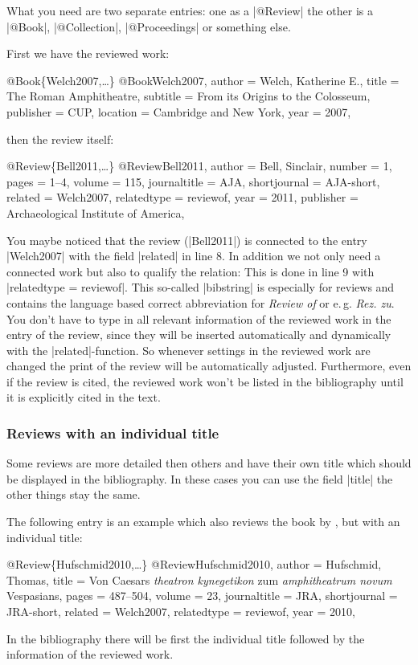 \documentclass[a4paper,
10pt,
greek,
french,
spanish,
italian,
ngerman,
english
]{ltxdoc}
\begin{document}
What you need are two separate entries: one as a |@Review| the other is a |@Book|, |@Collection|, |@Proceedings| or something else.

First we have the reviewed work:
\begin{bibexample}[label=Welch2007]{{@}Book\{Welch2007,…\}}
@Book{Welch2007,
  author    = {Welch, Katherine E.},
  title     = {The {Roman} Amphitheatre},
  subtitle  = {From its Origins to the Colosseum},
  publisher = CUP,    %
  location  = {Cambridge and New York},
  year      = {2007},
}
\end{bibexample}
then the review itself:
\begin{bibexample}[label=Bell2011]{{@}Review\{Bell2011,…\}}
@Review{Bell2011,
  author       = {Bell, Sinclair},
  number       = {1},
  pages        = {1--4},
  volume       = {115},
  journaltitle = AJA,    %
  shortjournal = AJA-short,    %
  related      = {Welch2007},
  relatedtype  = {reviewof},
  year         = {2011},
  publisher    = {Archaeological Institute of America},
}
\end{bibexample}
You maybe noticed that the review (|Bell2011|) is connected to the entry |Welch2007| with the field |related| in line 8.
In addition we not only need a connected work but also to qualify the relation:
This is done in line 9 with |relatedtype = {reviewof}|.
This so-called |bibstring| is especially for reviews and contains the language based correct abbreviation for \emph{Review of} or e.\,g. \emph{Rez. zu}.
You don’t have to type in all relevant information of the reviewed work in the entry of the review, 
since they will be inserted automatically and dynamically with the  |related|-function. 
So whenever settings in the reviewed work are changed the print of the review will be automatically adjusted. 
Furthermore, even if the review is cited, the reviewed work won't be listed in the bibliography until it is explicitly cited in the text.


\subsubsection{Reviews with an individual title}
Some reviews are more detailed then others and  have their own title which should be displayed in the bibliography.
In these cases you can use the field |title| the other things stay the same.

The following entry is an example which also reviews the book by \citeauthor*{Welch2007},  but with an individual title:
\begin{bibexample}[label=Hufschmid2010]{{@}Review\{Hufschmid2010,…\}}
@Review{Hufschmid2010,
  author       = {Hufschmid, Thomas},
  title        = {Von Caesars \emph{theatron kynegetikon} zum \emph{amphitheatrum novum} Vespasians},
  pages        = {487--504},
  volume       = {23},
  journaltitle = JRA,    %
  shortjournal = JRA-short,    %
  related      = {Welch2007},
  relatedtype  = {reviewof},
  year         = {2010},
}
\end{bibexample}
In the bibliography there will be first the individual title followed by the information of the reviewed work.
\end{document}
